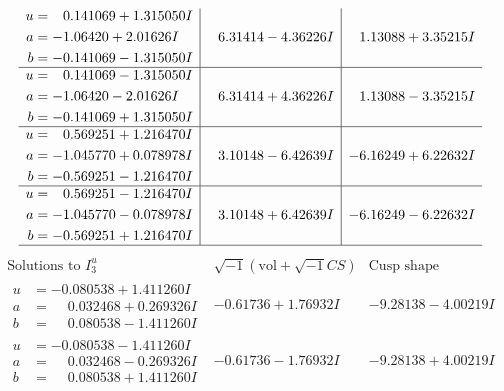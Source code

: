 \documentclass[1p]{elsarticle_modified}
\theoremstyle{definition}
\newcommand{\I}{\sqrt{-1}}
\begin{document}
$$\begin{array}{c|c|c}
\begin{aligned}
u &= \phantom{-}0.141069 + 1.315050 I \\
a &= -1.06420 + 2.01626 I \\
b &= -0.141069 - 1.315050 I\end{aligned}
 & \phantom{-}6.31414 - 4.36226 I & \phantom{-}1.13088 + 3.35215 I \\ \hline\begin{aligned}
u &= \phantom{-}0.141069 - 1.315050 I \\
a &= -1.06420 - 2.01626 I \\
b &= -0.141069 + 1.315050 I\end{aligned}
 & \phantom{-}6.31414 + 4.36226 I & \phantom{-}1.13088 - 3.35215 I \\ \hline\begin{aligned}
u &= \phantom{-}0.569251 + 1.216470 I \\
a &= -1.045770 + 0.078978 I \\
b &= -0.569251 - 1.216470 I\end{aligned}
 & \phantom{-}3.10148 - 6.42639 I & -6.16249 + 6.22632 I \\ \hline\begin{aligned}
u &= \phantom{-}0.569251 - 1.216470 I \\
a &= -1.045770 - 0.078978 I \\
b &= -0.569251 + 1.216470 I\end{aligned}
 & \phantom{-}3.10148 + 6.42639 I & -6.16249 - 6.22632 I\\
 \hline 
 \end{array}$$\newpage$$\begin{array}{c|c|c}  
\text{Solutions to }I^u_{3}& \I (\text{vol} + \sqrt{-1}CS) & \text{Cusp shape}\\
 \hline 
\begin{aligned}
u &= -0.080538 + 1.411260 I \\
a &= \phantom{-}0.032468 + 0.269326 I \\
b &= \phantom{-}0.080538 - 1.411260 I\end{aligned}
 & -0.61736 + 1.76932 I & -9.28138 - 4.00219 I \\ \hline\begin{aligned}
u &= -0.080538 - 1.411260 I \\
a &= \phantom{-}0.032468 - 0.269326 I \\
b &= \phantom{-}0.080538 + 1.411260 I\end{aligned}
 & -0.61736 - 1.76932 I & -9.28138 + 4.00219 I \\ \hline\begin{aligned}

\end{aligned}
\end{array}$$
\end{document}
